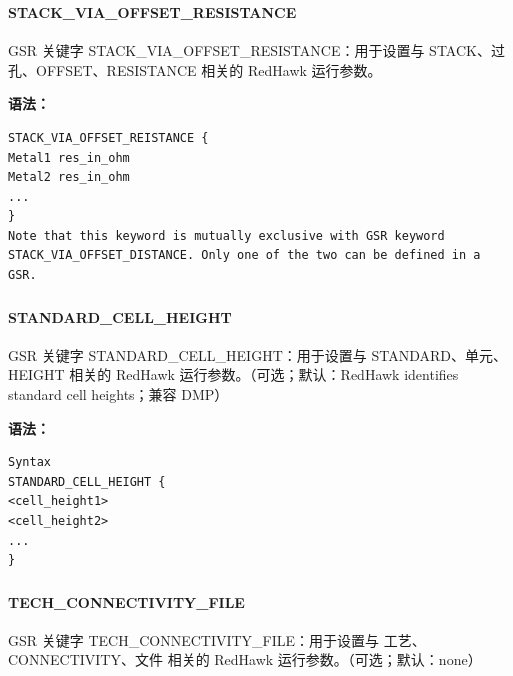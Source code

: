 \subsubsection{}
\paragraph*{STACK_VIA_OFFSET_RESISTANCE}

GSR 关键字 STACK_VIA_OFFSET_RESISTANCE：用于设置与 STACK、过孔、OFFSET、RESISTANCE 相关的 RedHawk 运行参数。

\textbf{语法：}
\begin{lstlisting}
STACK_VIA_OFFSET_REISTANCE {
Metal1 res_in_ohm
Metal2 res_in_ohm
...
}
Note that this keyword is mutually exclusive with GSR keyword
STACK_VIA_OFFSET_DISTANCE. Only one of the two can be defined in a GSR.
\end{lstlisting}

\subsubsection{}
\paragraph*{STANDARD_CELL_HEIGHT}

GSR 关键字 STANDARD_CELL_HEIGHT：用于设置与 STANDARD、单元、HEIGHT 相关的 RedHawk 运行参数。（可选；默认：RedHawk identifies standard cell heights；兼容 DMP）

\textbf{语法：}
\begin{lstlisting}
Syntax
STANDARD_CELL_HEIGHT {
<cell_height1>
<cell_height2>
...
}
\end{lstlisting}

\subsubsection{}
\paragraph*{TECH_CONNECTIVITY_FILE}

GSR 关键字 TECH_CONNECTIVITY_FILE：用于设置与 工艺、CONNECTIVITY、文件 相关的 RedHawk 运行参数。（可选；默认：none）

\subsubsection{}
